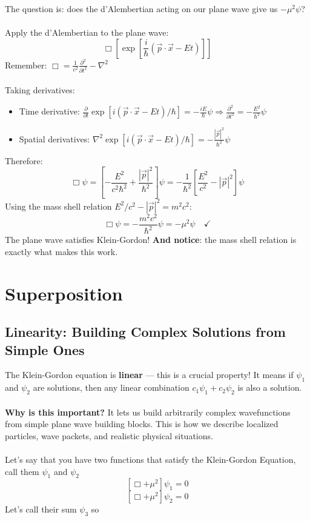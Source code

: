 \documentclass{report}
\begin{document}
The question is: does the d'Alembertian acting on our plane wave give us $-\mu^2\psi$?\\
\\
Apply the d'Alembertian to the plane wave:
\begin{equation}
	\Box\left[\exp\left[\frac{i}{\hbar}\left(\vec{p} \cdot \vec{x} - Et\right)\right]\right]
\end{equation}
Remember: $\Box = \frac{1}{c^2}\frac{\partial^2}{\partial t^2} - \nabla^2$\\
\\
Taking derivatives:
\begin{itemize}
	\item Time derivative: $\frac{\partial}{\partial t}\exp[i(\vec{p} \cdot \vec{x} - Et)/\hbar] = -\frac{iE}{\hbar}\psi \Rightarrow \frac{\partial^2}{\partial t^2} = -\frac{E^2}{\hbar^2}\psi$
	\item Spatial derivatives: $\nabla^2\exp[i(\vec{p} \cdot \vec{x} - Et)/\hbar] = -\frac{|\vec{p}|^2}{\hbar^2}\psi$
\end{itemize}
Therefore:
\begin{equation}
	\Box\psi = \left[-\frac{E^2}{c^2\hbar^2} + \frac{|\vec{p}|^2}{\hbar^2}\right]\psi = -\frac{1}{\hbar^2}\left[\frac{E^2}{c^2} - |\vec{p}|^2\right]\psi
\end{equation}
Using the mass shell relation $E^2/c^2 - |\vec{p}|^2 = m^2c^2$:
\begin{equation}
	\Box\psi = -\frac{m^2c^2}{\hbar^2}\psi = -\mu^2\psi \quad \checkmark
\end{equation}
The plane wave satisfies Klein-Gordon! \textbf{And notice}: the mass shell relation is exactly what makes this work.

\chapter{Superposition}
\section{Linearity: Building Complex Solutions from Simple Ones}
\vspace{1em}
The Klein-Gordon equation is \textbf{linear} --- this is a crucial property! It means if $\psi_1$ and $\psi_2$ are solutions, then any linear combination $c_1\psi_1 + c_2\psi_2$ is also a solution.\\
\\
\textbf{Why is this important?} It lets us build arbitrarily complex wavefunctions from simple plane wave building blocks. This is how we describe localized particles, wave packets, and realistic physical situations.\\
\\
Let's say that you have two functions that satisfy the Klein-Gordon Equation, call them $\displaystyle \psi_1$ and $\displaystyle \psi_2$
\begin{equation}
	\left[ \Box + \mu^2 \right]\psi_1 = 0
\end{equation}
\begin{equation}
	\left[ \Box + \mu^2 \right]\psi_2 = 0
\end{equation}
Let's call their sum $\displaystyle \psi_3$ so
\end{document}
